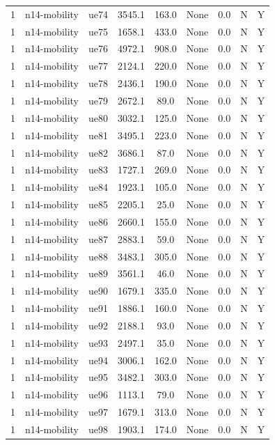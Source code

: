 \begin{table}[ht]
\begin{tabular}{|c|c|c|c|c|c|c|c|c|}
1 & n14-mobility & ue74 & 3545.1 & 163.0 & None & 0.0 & N & Y \\
1 & n14-mobility & ue75 & 1658.1 & 433.0 & None & 0.0 & N & Y \\
1 & n14-mobility & ue76 & 4972.1 & 908.0 & None & 0.0 & N & Y \\
1 & n14-mobility & ue77 & 2124.1 & 220.0 & None & 0.0 & N & Y \\
1 & n14-mobility & ue78 & 2436.1 & 190.0 & None & 0.0 & N & Y \\
1 & n14-mobility & ue79 & 2672.1 & 89.0 & None & 0.0 & N & Y \\
1 & n14-mobility & ue80 & 3032.1 & 125.0 & None & 0.0 & N & Y \\
1 & n14-mobility & ue81 & 3495.1 & 223.0 & None & 0.0 & N & Y \\
1 & n14-mobility & ue82 & 3686.1 & 87.0 & None & 0.0 & N & Y \\
1 & n14-mobility & ue83 & 1727.1 & 269.0 & None & 0.0 & N & Y \\
1 & n14-mobility & ue84 & 1923.1 & 105.0 & None & 0.0 & N & Y \\
1 & n14-mobility & ue85 & 2205.1 & 25.0 & None & 0.0 & N & Y \\
1 & n14-mobility & ue86 & 2660.1 & 155.0 & None & 0.0 & N & Y \\
1 & n14-mobility & ue87 & 2883.1 & 59.0 & None & 0.0 & N & Y \\
1 & n14-mobility & ue88 & 3483.1 & 305.0 & None & 0.0 & N & Y \\
1 & n14-mobility & ue89 & 3561.1 & 46.0 & None & 0.0 & N & Y \\
1 & n14-mobility & ue90 & 1679.1 & 335.0 & None & 0.0 & N & Y \\
1 & n14-mobility & ue91 & 1886.1 & 160.0 & None & 0.0 & N & Y \\
1 & n14-mobility & ue92 & 2188.1 & 93.0 & None & 0.0 & N & Y \\
1 & n14-mobility & ue93 & 2497.1 & 35.0 & None & 0.0 & N & Y \\
1 & n14-mobility & ue94 & 3006.1 & 162.0 & None & 0.0 & N & Y \\
1 & n14-mobility & ue95 & 3482.1 & 303.0 & None & 0.0 & N & Y \\
1 & n14-mobility & ue96 & 1113.1 & 79.0 & None & 0.0 & N & Y \\
1 & n14-mobility & ue97 & 1679.1 & 313.0 & None & 0.0 & N & Y \\
1 & n14-mobility & ue98 & 1903.1 & 174.0 & None & 0.0 & N & Y \\

\end{tabular}
\end{table}

